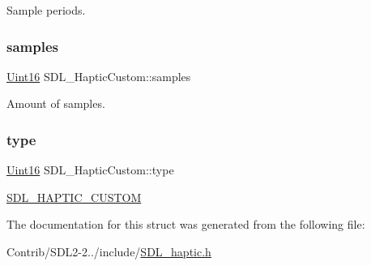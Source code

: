 Sample periods. \mbox{\label{struct_s_d_l___haptic_custom_a5905ea1b6182da846535ca8c80b4fa33}} 
\subsubsection{\texorpdfstring{samples}{samples}}
{\footnotesize\ttfamily \mbox{\hyperlink{_s_d_l__stdinc_8h_a31fcc0a076c9068668173ee26d33e42b}{Uint16}} S\+D\+L\+\_\+\+Haptic\+Custom\+::samples}

Amount of samples. \mbox{\label{struct_s_d_l___haptic_custom_a98a8995c94492069dc007502ed97eed2}} 
\subsubsection{\texorpdfstring{type}{type}}
{\footnotesize\ttfamily \mbox{\hyperlink{_s_d_l__stdinc_8h_a31fcc0a076c9068668173ee26d33e42b}{Uint16}} S\+D\+L\+\_\+\+Haptic\+Custom\+::type}

\mbox{\hyperlink{_s_d_l__haptic_8h_a8a18c4de1076ac9bebd718329d16db29}{S\+D\+L\+\_\+\+H\+A\+P\+T\+I\+C\+\_\+\+C\+U\+S\+T\+OM}} 

The documentation for this struct was generated from the following file\+:\begin{DoxyCompactItemize}
\item 
Contrib/\+S\+D\+L2-\/2../include/\mbox{\hyperlink{_s_d_l__haptic_8h}{S\+D\+L\+\_\+haptic.\+h}}\end{DoxyCompactItemize}
